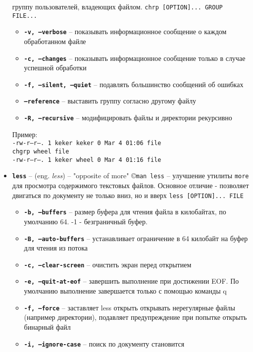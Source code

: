 \documentclass[12pt, a4paper]{article}
\begin{document}
\begin{itemize}
    группу пользователей, владеющих файлом. \texttt{chrp [OPTION]... GROUP FILE...}
  \begin{itemize}
    \item \textbf{\texttt{-v, --verbose}} -- показывать информационное сообщение
      о каждом обработанном файле
    \item \textbf{\texttt{-c, --changes}} -- показывать информационное сообщение
      только в случае успешной обработки
    \item \textbf{\texttt{-f, --silent, --quiet}} -- подавлять большинство
      сообщений об ошибках
    \item \textbf{\texttt{--reference}} -- выставить группу
      согласно другому файлу
    \item \textbf{\texttt{-R, --recursive}} -- модифицировать файлы и директории
      рекурсивно
  \end{itemize}
  Пример:\\
  \texttt{-rw-r--r--. 1 keker keker     0 Mar  4 01:06 file}\\
  \texttt{chgrp wheel file}\\
  \texttt{-rw-r--r--. 1 keker wheel     0 Mar  4 01:16 file}\\
  \item \textbf{\texttt{less}} -- (eng. \textit{less}) -- "opposite of more"
    \copyright \texttt{man less} -- улучшение утилиты \texttt{more} для
    просмотра содержимого текстовых файлов. Основное отличие - позволяет
    двигаться по документу не только вниз, но и вверх
    \texttt{less [OPTION]... FILE}
  \begin{itemize}
    \item \textbf{\texttt{-b, --buffers}} -- размер буфера для чтения файла в
      килобайтах, по умолчанию 64. -1 - безграничный буфер.
    \item \textbf{\texttt{-B, --auto-buffers}} -- устанавливает ограничение в
      64 килобайт на буфер для чтения из потока
    \item \textbf{\texttt{-c, --clear-screen}} -- очистить экран перед
      открытием
    \item \textbf{\texttt{-e, --quit-at-eof}} -- завершить выполнение при
      достижении EOF. По умолчанию выполнение завершается только с помощью
      команды q
    \item \textbf{\texttt{-f, --force}} -- заставляет less открыть открывать
      нерегулярные файлы (например директории), подавляет предупреждение при
      попытке открыть бинарный файл
    \item \textbf{\texttt{-i, --ignore-case}} -- поиск по документу становится

\end{itemize}
\end{itemize}
\end{document}
